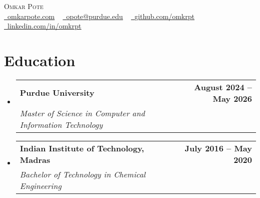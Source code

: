 \documentclass[letterpaper,11pt]{article}
\makeatletter
\newcommand{\resumeSubheading}[4]{
  \vspace{-2pt}\item
    \begin{tabular*}{1.0\textwidth}[t]{l@{\extracolsep{\fill}}r}
      \textbf{#1} & \textbf{\small #2} \\
      \textit{\small#3} & \textit{\small #4} \\
    \end{tabular*}\vspace{-7pt}
}
\newcommand{\resumeSubHeadingListStart}{\begin{itemize}[leftmargin=0.0in, label={}]}
\newcommand{\resumeSubHeadingListEnd}{\end{itemize}}
\makeatother
\begin{document}

\begin{center}
    {\vspace*{30pt} \Huge \scshape Omkar Pote} \\ \vspace{5pt} 
    \small
    \href{https://omkarpote.com}{\raisebox{-0.2\height}\faGlobe\  \underline{omkarpote.com}} ~ 
    \href{mailto:opote@purdue.edu}{\raisebox{-0.2\height}\faEnvelope\  \underline{opote@purdue.edu}} ~
    \href{https://github.com/omkrpt}{\raisebox{-0.2\height}\faGithub\ \underline{github.com/omkrpt}} ~ 
    \href{https://linkedin.com/in/omkrpt/}{\raisebox{-0.2\height}\faLinkedin\ \underline{linkedin.com/in/omkrpt}}
    \vspace{-8pt}
\end{center}


\section{Education}
  \resumeSubHeadingListStart
    \resumeSubheading
      {Purdue University}{August 2024 -- May 2026}
      {Master of Science in Computer and Information Technology}{}
    \resumeSubheading
      {Indian Institute of Technology, Madras}{July 2016 -- May 2020}
      {Bachelor of Technology in Chemical Engineering}{}
  \resumeSubHeadingListEnd

\end{document}
